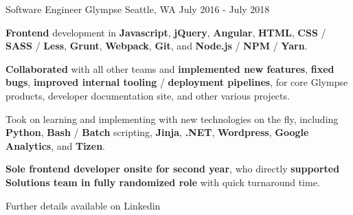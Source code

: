 \begin{cventries}
\cventry
{Software Engineer} %
{Glympse} %
{Seattle, WA} %
{July 2016 - July 2018} %
{
\begin{cvitems}
\item {\textbf{Frontend} development in \textbf{Javascript}, \textbf{jQuery}, \textbf{Angular}, \textbf{HTML}, \textbf{CSS} / \textbf{SASS} / \textbf{Less}, \textbf{Grunt}, \textbf{Webpack}, \textbf{Git}, and \textbf{Node.js} / \textbf{NPM} / \textbf{Yarn}.}
\item {\textbf{Collaborated} with all other teams and \textbf{implemented new features}, \textbf{fixed bugs}, \textbf{improved internal tooling} / \textbf{deployment pipelines}, for core Glympse products, developer documentation site, and other various projects.}
\item {Took on learning and implementing with new technologies on the fly, including \textbf{Python}, \textbf{Bash} / \textbf{Batch} scripting, \textbf{Jinja}, \textbf{.NET}, \textbf{Wordpress}, \textbf{Google Analytics}, and \textbf{Tizen}.}
\item {\textbf{Sole frontend developer onsite for second year}, who directly \textbf{supported Solutions team in fully randomized role} with quick turnaround time.}
\end{cvitems}
}

\cventry
{} %
{Further details available on Linkedin} %
{} %
{} %
{}

\end{cventries}
